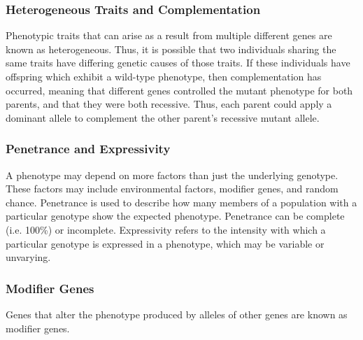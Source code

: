 \documentclass[12pt,titlepage]{article}
\begin{document}
        \subsubsection{Heterogeneous Traits and Complementation}
          Phenotypic traits that can arise as a result from multiple different genes are known as heterogeneous. Thus, it is possible that two individuals
          sharing the same traits have differing genetic causes of those traits. If these individuals have offspring which exhibit a wild-type phenotype, then
          complementation has occurred, meaning that different genes controlled the mutant phenotype for both parents, and that they were both recessive. Thus,
          each parent could apply a dominant allele to complement the other parent's recessive mutant allele.

        \subsubsection{Penetrance and Expressivity}
          A phenotype may depend on more factors than just the underlying genotype. These factors may include environmental factors, modifier genes, and random
          chance. Penetrance is used to describe how many members of a population with a particular genotype show the expected phenotype. Penetrance can be complete
          (i.e. 100\%) or incomplete. Expressivity refers to the intensity with which a particular genotype is expressed in a phenotype, which may be variable or
          unvarying.

        \subsubsection{Modifier Genes}
          Genes that alter the phenotype produced by alleles of other genes are known as modifier genes.
\end{document}
